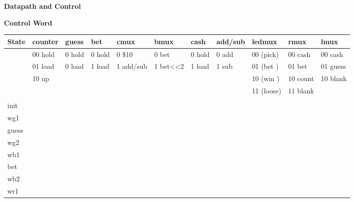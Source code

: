 \documentclass{article}[10 pt,landscape]
\begin{document}
\begin{landscape}
    {\bf Datapath and Control}
    \begin{figure}[ht]
    \end{figure}

    \pagebreak
    {\bf Control Word}

    {\normalsize
        \begin{tabular}{l|l|l|l|l|l|l|l|l|l|l}
            State &  counter& guess  & bet    & cmux      & bmux     & cash   & add/sub & ledmux    & rmux
            & lmux \\ \hline
            & 00 hold & 0 hold & 0 hold & 0 \$10    & 0 bet    & 0 hold & 0 add  & 00 (pick) &00 cash &00
            cash  \\ \hline
            & 01 load & 0 load & 1 load & 1 add/sub & 1 bet<<2 & 1 load & 1 sub  & 01 (bet ) &01 bet  &01
            guess \\ \hline
            & 10 up   &        &        &            &          &        &        & 10 (win ) &10 count&10
            blank \\ \hline
            &         &        &        &            &          &        &        & 11 (loose)&11 blank&
            \\ \hline
            &         &        &        &            &          &        &        &          &         &   \\ \hline
            init  &       &       &       &           &         &       &       &        &       & \\ \hline
            wg1   &       &       &       &           &         &       &       &        &       & \\ \hline
            guess &       &       &       &           &         &       &       &        &       & \\ \hline
            wg2   &       &       &       &           &         &       &       &        &       & \\ \hline
            wb1   &       &       &       &           &         &       &       &        &       & \\ \hline
            bet   &       &       &       &           &         &       &       &        &       & \\ \hline
            wb2   &       &       &       &           &         &       &       &        &       & \\ \hline
            wr1   &       &       &       &           &         &       &       &        &       & \\ \hline

\end{tabular}}
\end{landscape}
\end{document}

